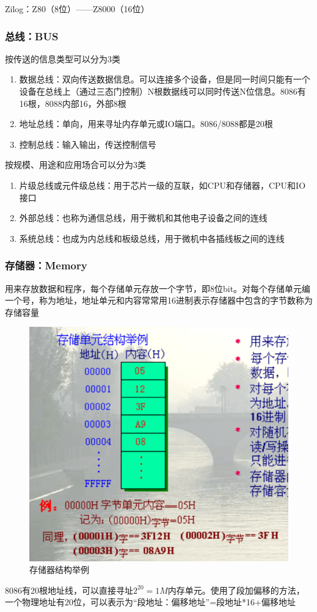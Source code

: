 Zilog：Z80（8位）——Z8000（16位）
\subsubsection{总线：BUS}
按传送的信息类型可以分为3类
\begin{enumerate}
    \item 数据总线：双向传送数据信息。可以连接多个设备，但是同一时间只能有一个设备在总线上（通过三态门控制）N根数据线可以同时传送N位信息。8086有16根，8088内部16，外部8根
    \item 地址总线：单向，用来寻址内存单元或IO端口。8086/8088都是20根
    \item 控制总线：输入输出，传送控制信号
\end{enumerate}
按规模、用途和应用场合可以分为3类
\begin{enumerate}
    \item 片级总线或元件级总线：用于芯片一级的互联，如CPU和存储器，CPU和IO接口
    \item 外部总线：也称为通信总线，用于微机和其他电子设备之间的连线
    \item 系统总线：也成为内总线和板级总线，用于微机中各插线板之间的连线
\end{enumerate}
\subsubsection{存储器：Memory}
用来存放数据和程序，每个存储单元存放一个字节，即8位bit。对每个存储单元编一个号，称为地址，地址单元和内容常常用16进制表示存储器中包含的字节数称为存储容量
\begin{figure}[H]
    \centering
    \includegraphics[scale=1]{part_8086CPU/part_8086CPU_pic/存储器结构举例.png}
    \caption{存储器结构举例}
\end{figure}
8086有20根地址线，可以直接寻址$2^{20}=1M$内存单元。使用了段加偏移的方法，一个物理地址有20位，可以表示为“段地址：偏移地址”=段地址*16+偏移地址

